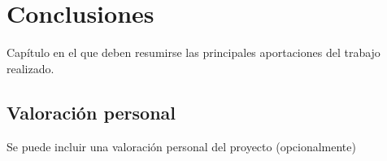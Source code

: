 
\chapter{Conclusiones}

Capítulo en el que deben resumirse las principales aportaciones del trabajo realizado.


\section{Valoración personal}
Se puede incluir una valoración personal del proyecto (opcionalmente)